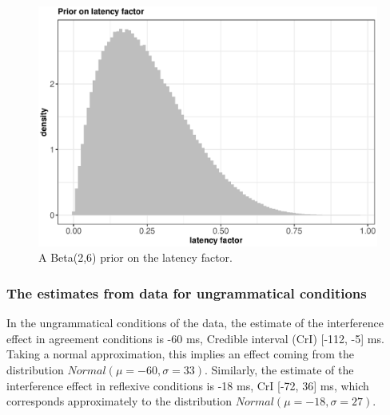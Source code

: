 \documentclass{cambridge7A}\usepackage[]{graphicx}\usepackage[]{color}
\makeatletter
\def\maxwidth{ %
  \ifdim\Gin@nat@width>\linewidth
    \linewidth
  \else
    \Gin@nat@width
  \fi
}
\newenvironment{knitrout}{}{} %
\makeatother
\begin{document}
\begin{figure}[!htbp]
\centering
\begin{knitrout}
\color{fgcolor}

{\centering \includegraphics[width=\maxwidth]{figures/fig-betaprior-1} 

}



\end{knitrout}
\caption{A Beta(2,6) prior on the latency factor.}\label{fig:betaprior}
\end{figure}


\subsubsection{The estimates from data for ungrammatical conditions}

In the ungrammatical conditions of the \cite{DillonMishlerSloggett2013} data, the estimate of the interference effect in agreement conditions is -60 ms, Credible interval (CrI) [-112, -5] ms. Taking a normal approximation, this implies an effect coming from the distribution $Normal(\mu=-60,\sigma=33)$.
Similarly, the estimate of the interference effect in reflexive conditions is -18 ms, CrI [-72, 36] ms, which corresponds approximately to the distribution $Normal(\mu=-18,\sigma=27)$.
\end{document}
